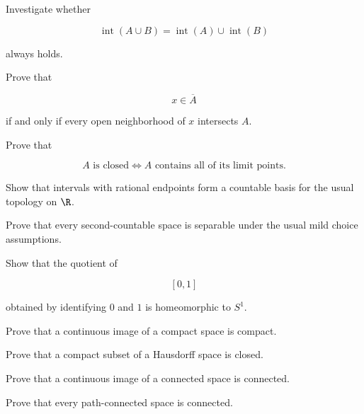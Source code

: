 \begin{exercise}[3]
Investigate whether

\[
\operatorname{int}(A\cup B)
=
\operatorname{int}(A)\cup\operatorname{int}(B)
\]

always holds.
\end{exercise}

\begin{exercise}[3]
Prove that

\[
x\in\overline{A}
\]

if and only if every open neighborhood of \(x\) intersects \(A\).
\end{exercise}

\begin{exercise}[3]
Prove that

\[
A\text{ is closed}
\iff
A
\text{ contains all of its limit points}.
\]
\end{exercise}

\begin{exercise}[3]
Show that intervals with rational endpoints form a countable basis for the
usual topology on \(\R\).
\end{exercise}

\begin{exercise}[3]
Prove that every second-countable space is separable under the usual mild
choice assumptions.
\end{exercise}

\begin{exercise}[3]
Show that the quotient of

\[
[0,1]
\]

obtained by identifying \(0\) and \(1\) is homeomorphic to \(S^1\).
\end{exercise}

\begin{exercise}[3]
Prove that a continuous image of a compact space is compact.
\end{exercise}

\begin{exercise}[3]
Prove that a compact subset of a Hausdorff space is closed.
\end{exercise}

\begin{exercise}[3]
Prove that a continuous image of a connected space is connected.
\end{exercise}

\begin{exercise}[3]
Prove that every path-connected space is connected.
\end{exercise}

